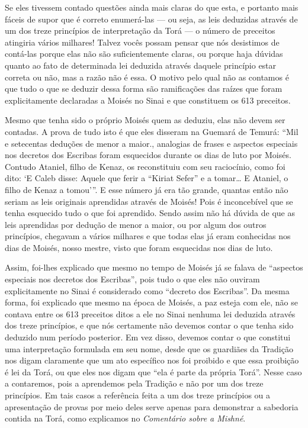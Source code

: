 Se eles tivessem contado questões ainda mais claras do que esta, e
portanto mais fáceis de supor que é correto enumerá-las --- ou seja, as
leis deduzidas através de um dos treze princípios de interpretação da
Torá --- o número de preceitos atingiria vários milhares! Talvez vocês
possam pensar que nós desistimos de contá-las porque elas não são
suficientemente claras, ou porque haja dúvidas quanto ao fato de
determinada lei deduzida através daquele princípio estar correta ou não,
mas a razão não é essa. O motivo pelo qual não as contamos é que tudo o
que se deduzir dessa forma são ramificações das raízes que foram
explicitamente declaradas a Moisés no Sinai e que constituem os 613
preceitos.

Mesmo que tenha sido o próprio Moisés quem as deduziu, elas não devem
ser contadas. A prova de tudo isto é que eles disseram na Guemará de
Temurá: ``Mil e setecentas deduções de menor a maior., analogias de
frases e aspectos especiais nos decretos dos Escribas foram esquecidos
durante os dias de luto por Moisés. Contudo Ataniel, filho de Kenaz, os
reconstituiu com seu raciocínio, como foi dito: `E Caleb disse: Aquele
que ferir a ``Kiriat Sefer'' e a tomar\ldots{} E Ataniel, o filho de Kenaz a
tomou'''. E esse número já era tão grande, quantas então não seriam as
leis originais aprendidas através de Moisés! Pois é inconcebível que se
tenha esquecido tudo o que foi aprendido. Sendo assim não há dúvida de
que as leis aprendidas por dedução de menor a maior, ou por algum dos
outros princípios, chegavam a vários milhares e que todas elas já eram
conhecidas nos dias de Moisés, nosso mestre, visto que foram esquecidas
nos dias de luto.

Assim, foi-lhes explicado que mesmo no tempo de Moisés já se falava de
``aspectos especiais nos decretos dos Escribas'', pois tudo o que eles
não ouviram explicitamente no Sinai é considerado como ``decreto dos
Escribas''. Da mesma forma, foi explicado que mesmo na época de Moisés,
a paz esteja com ele, não se contava entre os 613 preceitos ditos a ele
no Sinai nenhuma lei deduzida através dos treze princípios, e que nós
certamente não devemos contar o que tenha sido deduzido num período
posterior. Em vez disso, devemos contar o que constitui uma
interpretação formulada em seu nome, desde que os guardiães da Tradição
nos digam claramente que um ato específico nos foi proibido e que essa
proibição é lei da Torá, ou que eles nos digam que ``ela é parte da
própria Torá''. Nesse caso a contaremos, pois a aprendemos pela
Tradição e não por um dos treze princípios. Em tais casos a referência
feita a um dos treze princípios ou a apresentação de provas por meio
deles serve apenas para demonstrar a sabedoria contida na Torá, como
explicamos no \emph{Comentário sobre a Mishné}.

